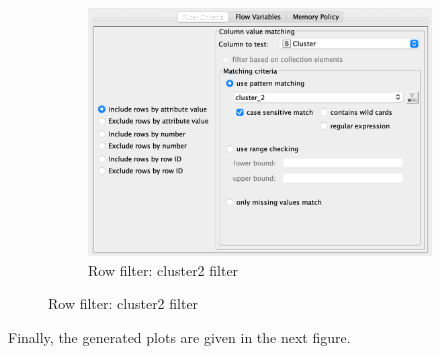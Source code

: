 \documentclass[11pt]{article}
\begin{document}
\begin{figure}[H]
\begin{subfigure}{0.4\textwidth}
					\includegraphics[width=\textwidth]{res/t1/t14/t14-row-filter-3-conf}
					\caption{Row filter: cluster2 filter}
					\label{fig:third}
				\end{subfigure}	
				\label{fig:figures}
			\end{figure}
			\fi
			Finally, the generated plots are given in the next figure.
			\iffalse
\end{document}
